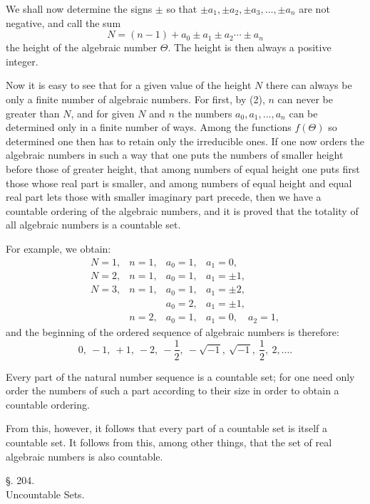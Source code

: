 \documentclass[11pt]{article}
\begin{document}
We shall now determine the signs $\pm$ so that $\pm a_1,\pm a_2,\pm a_3,\ldots,\pm a_n$ are not negative, and call the sum
\begin{equation}\tag{2}
N=(n-1)+a_0\pm a_1\pm a_2\cdots\pm a_n
\end{equation}
the height of the algebraic number $\Theta$. The height is then always a positive integer.

Now it is easy to see that for a given value of the height $N$ there can always be only a finite number of algebraic numbers. For first, by (2), $n$ can never be greater than $N$, and for given $N$ and $n$ the numbers $a_0,a_1,\ldots,a_n$ can be determined only in a finite number of ways. Among the functions $f(\Theta)$ so determined one then has to retain only the irreducible ones. If one now orders the algebraic numbers in such a way that one puts the numbers of smaller height before those of greater height, that among numbers of equal height one puts first those whose real part is smaller, and among numbers of equal height and equal real part lets those with smaller imaginary part precede, then we have a countable ordering of the algebraic numbers, and it is proved that the totality of all algebraic numbers is a countable set.

For example, we obtain:
\[
\begin{array}{llll}
N=1, & n=1, & a_0=1, & a_1=0,\\
N=2, & n=1, & a_0=1, & a_1=\pm1,\\
N=3, & n=1, & a_0=1, & a_1=\pm2,\\
     &      & a_0=2, & a_1=\pm1,\\
     & n=2, & a_0=1, & a_1=0,\quad a_2=1,
\end{array}
\]
and the beginning of the ordered sequence of algebraic numbers is therefore:
\[
0,\ -1,\ +1,\ -2,\ -\frac12,\ -\sqrt{-1},\ \sqrt{-1},\ \frac12,\ 2,\ldots .
\]

Every part of the natural number sequence is a countable set; for one need only order the numbers of such a part according to their size in order to obtain a countable ordering.

From this, however, it follows that every part of a countable set is itself a countable set. It follows from this, among other things, that the set of real algebraic numbers is also countable.

\begin{center}
{\large §. 204.}\\[0.4em]
{\large Uncountable Sets.}
\end{center}
\end{document}
